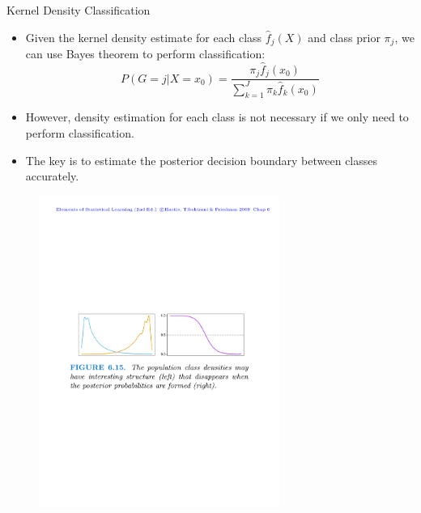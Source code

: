 \documentclass[aspectratio=169]{beamer}
\begin{document}
\begin{frame}{Kernel Density Classification}
    \begin{itemize}
        \item Given the kernel density estimate for each class $\hat{f}_j(X)$ and class prior $\pi_j$, we can use Bayes theorem to perform classification:
        \begin{equation*}
            P(G=j|X=x_0) = \frac{\pi_j \hat{f}_j(x_0)}{\sum_{k=1}^J\pi_k \hat{f}_k(x_0)}
        \end{equation*}
        \item However, density estimation for each class is not necessary if we only need to perform classification.
        \item The key is to estimate the posterior decision boundary between classes accurately.
    \end{itemize}
    \begin{figure}
        \centering
        \includegraphics[width=0.7\textwidth]{figures/classdensities.pdf}
    \end{figure}
\end{frame}
\end{document}
